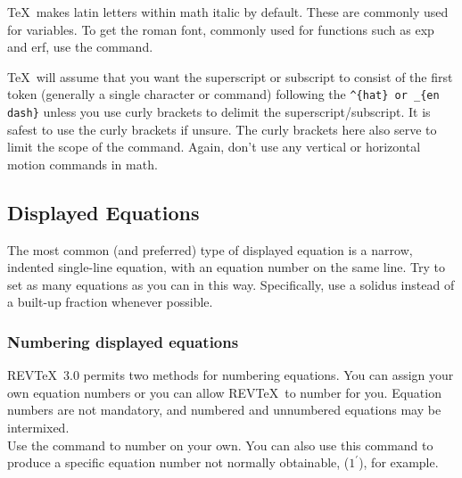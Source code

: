      \TeX\ makes latin letters within math italic by default.
These are commonly used for variables.   To get the roman font,
commonly used for functions such as exp and erf, use the 
command. \\


     \TeX\ will assume that you want the superscript or subscript
to consist of the first token (generally a single character or
command) following the \verb+^{hat} or _{en dash}+ unless you use curly
brackets to delimit the superscript/subscript.  It is safest to
use the curly brackets if unsure.  The curly brackets here also
serve to limit the scope of the  command.  Again, don't use
any vertical or horizontal motion commands in math.

\subsection{  Displayed Equations }

     The most common (and preferred) type of displayed equation
is a narrow, indented single-line equation, with an equation
number on the same line.  Try to set as many equations as you can
in this way.  Specifically, use a solidus instead of a built-up
fraction whenever possible.


\subsubsection{  Numbering displayed equations }

     REV\TeX\ 3.0 permits two methods for numbering equations.  You
can assign your own equation numbers or you can allow REV\TeX\ to
number for you.  Equation numbers are not mandatory, and numbered
and unnumbered equations may be intermixed. \\

     Use the command  to number on your own.
You can also use this command to produce a specific equation
number not normally obtainable, ($1^{\prime}$), for example.  \\


